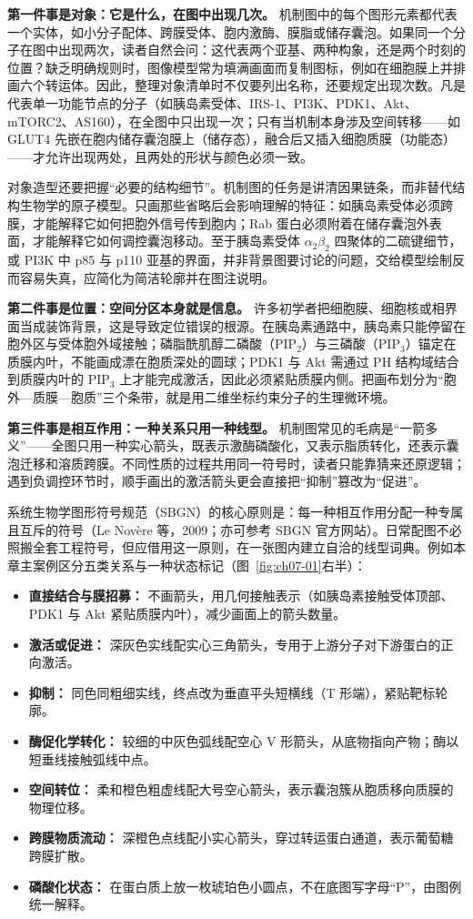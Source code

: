 \textbf{第一件事是对象：它是什么，在图中出现几次。} 机制图中的每个图形元素都代表一个实体，如小分子配体、跨膜受体、胞内激酶、膜脂或储存囊泡。如果同一个分子在图中出现两次，读者自然会问：这代表两个亚基、两种构象，还是两个时刻的位置？缺乏明确规则时，图像模型常为填满画面而复制图标，例如在细胞膜上并排画六个转运体。因此，整理对象清单时不仅要列出名称，还要规定出现次数。凡是代表单一功能节点的分子（如胰岛素受体、IRS-1、PI3K、PDK1、Akt、mTORC2、AS160），在全图中只出现一次；只有当机制本身涉及空间转移——如 GLUT4 先嵌在胞内储存囊泡膜上（储存态），融合后又插入细胞质膜（功能态）——才允许出现两处，且两处的形状与颜色必须一致。

对象造型还要把握“必要的结构细节”。机制图的任务是讲清因果链条，而非替代结构生物学的原子模型。只画那些省略后会影响理解的特征：如胰岛素受体必须跨膜，才能解释它如何把胞外信号传到胞内；Rab 蛋白必须附着在储存囊泡外表面，才能解释它如何调控囊泡移动。至于胰岛素受体 $\alpha_2\beta_2$ 四聚体的二硫键细节，或 PI3K 中 p85 与 p110 亚基的界面，并非背景图要讨论的问题，交给模型绘制反而容易失真，应简化为简洁轮廓并在图注说明。

\textbf{第二件事是位置：空间分区本身就是信息。} 许多初学者把细胞膜、细胞核或相界面当成装饰背景，这是导致定位错误的根源。在胰岛素通路中，胰岛素只能停留在胞外区与受体胞外域接触；磷脂酰肌醇二磷酸（$\text{PIP}_2$）与三磷酸（$\text{PIP}_3$）锚定在质膜内叶，不能画成漂在胞质深处的圆球；PDK1 与 Akt 需通过 PH 结构域结合到质膜内叶的 $\text{PIP}_3$ 上才能完成激活，因此必须紧贴质膜内侧。把画布划分为“胞外—质膜—胞质”三个条带，就是用二维坐标约束分子的生理微环境。

\textbf{第三件事是相互作用：一种关系只用一种线型。} 机制图常见的毛病是“一箭多义”——全图只用一种实心箭头，既表示激酶磷酸化，又表示脂质转化，还表示囊泡迁移和溶质跨膜。不同性质的过程共用同一符号时，读者只能靠猜来还原逻辑；遇到负调控环节时，顺手画出的激活箭头更会直接把“抑制”篡改为“促进”。

系统生物学图形符号规范（SBGN）的核心原则是：每一种相互作用分配一种专属且互斥的符号（Le Novère 等，2009；亦可参考 SBGN 官方网站）。日常配图不必照搬全套工程符号，但应借用这一原则，在一张图内建立自洽的线型词典。例如本章主案例区分五类关系与一种状态标记（图~\ref{fig:ch07-01}右半）：
\begin{itemize}
\item \textbf{直接结合与膜招募：} 不画箭头，用几何接触表示（如胰岛素接触受体顶部、PDK1 与 Akt 紧贴质膜内叶），减少画面上的箭头数量。
\item \textbf{激活或促进：} 深灰色实线配实心三角箭头，专用于上游分子对下游蛋白的正向激活。
\item \textbf{抑制：} 同色同粗细实线，终点改为垂直平头短横线（T 形端），紧贴靶标轮廓。
\item \textbf{酶促化学转化：} 较细的中灰色弧线配空心 V 形箭头，从底物指向产物；酶以短垂线接触弧线中点。
\item \textbf{空间转位：} 柔和橙色粗虚线配大号空心箭头，表示囊泡簇从胞质移向质膜的物理位移。
\item \textbf{跨膜物质流动：} 深橙色点线配小实心箭头，穿过转运蛋白通道，表示葡萄糖跨膜扩散。
\item \textbf{磷酸化状态：} 在蛋白质上放一枚琥珀色小圆点，不在底图写字母“P”，由图例统一解释。
\end{itemize}

